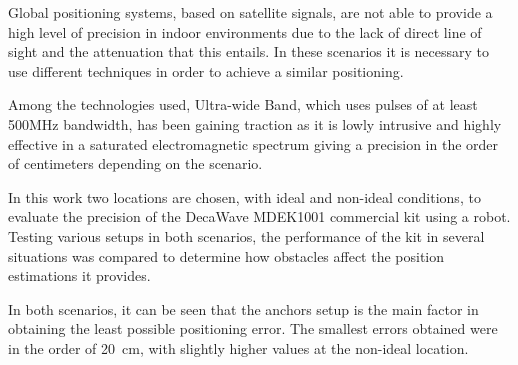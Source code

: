 Global positioning systems, based on satellite signals, are not able to provide a high level of precision in indoor environments due to the lack of direct line of sight and the attenuation that this entails.
In these scenarios it is necessary to use different techniques in order to achieve a similar positioning.

Among the technologies used, Ultra-wide Band, which uses pulses of at least 500MHz bandwidth, has been gaining traction as it is lowly intrusive and highly effective in a saturated electromagnetic spectrum giving a precision in the order of centimeters depending on the scenario.

In this work two locations are chosen, with ideal and non-ideal conditions, to evaluate the precision of the DecaWave MDEK1001 commercial kit using a robot.
Testing various setups in both scenarios, the performance of the kit in several situations was compared to determine how obstacles affect the position estimations it provides.

In both scenarios, it can be seen that the anchors setup is the main factor in obtaining the least possible positioning error.
The smallest errors obtained were in the order of 20~cm, with slightly higher values at the non-ideal location.
